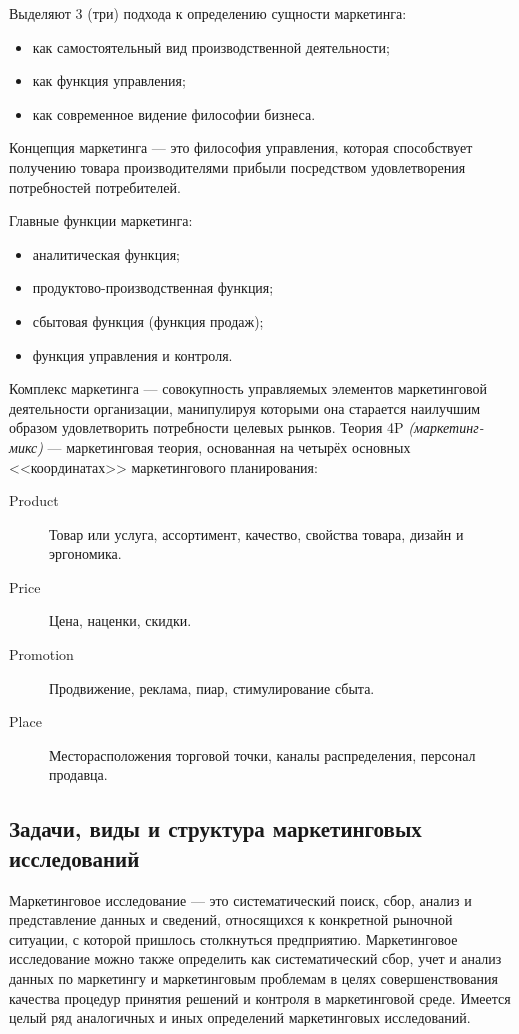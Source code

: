 \documentclass[a4paper,12pt,oneside,final]{extarticle}
\numberwithin{equation}{section}
\begin{document}
Выделяют 3 (три) подхода к определению сущности маркетинга:
\begin{itemize}
	\item как самостоятельный вид производственной деятельности;
	\item как функция управления;
	\item как современное видение философии бизнеса.
\end{itemize}

Концепция маркетинга --- это философия управления, которая способствует получению товара производителями прибыли посредством удовлетворения потребностей потребителей.

Главные функции маркетинга:
\begin{itemize}
	\item аналитическая функция;
	\item продуктово-производственная функция;
	\item сбытовая функция (функция продаж);
	\item функция управления и контроля.
\end{itemize}

Комплекс маркетинга --- совокупность управляемых элементов маркетинговой деятельности организации, манипулируя которыми она старается наилучшим образом удовлетворить потребности целевых рынков.
Теория 4P \textit{(маркетинг-микс)} — маркетинговая теория, основанная на четырёх основных <<координатах>> маркетингового планирования:
\begin{description}
	\item[Product] Товар или услуга, ассортимент, качество, свойства товара, дизайн и эргономика.
	\item[Price] Цена, наценки, скидки.
	\item[Promotion] Продвижение, реклама, пиар, стимулирование сбыта.
	\item[Place] Месторасположения торговой точки, каналы распределения, персонал продавца.
\end{description}

\subsection{Задачи, виды и структура маркетинговых исследований}
Маркетинговое исследование --- это систематический поиск, сбор, анализ и представление данных и сведений, относящихся к конкретной рыночной ситуации, с которой пришлось столкнуться предприятию. 
Маркетинговое исследование можно также определить как систематический сбор, учет и анализ данных по маркетингу и маркетинговым проблемам в целях совершенствования качества процедур принятия решений и контроля в маркетинговой среде. 
Имеется целый ряд аналогичных и иных определений маркетинговых исследований.
\end{document}
